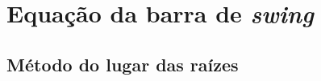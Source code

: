 \section{Equação da barra de \textit{swing}}

\lipsum[1]

\subsection{Método do lugar das raízes}
\lipsum[1]


\pagebreak

